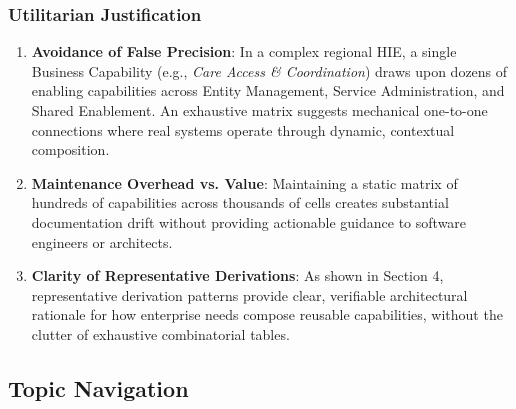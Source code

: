 \label{rad:tier-model:266}
\subsubsection*{Utilitarian Justification}
\label{rad:tier-model:267}

\begin{enumerate}

\item
\textbf{Avoidance of False Precision}: In a complex regional HIE, a single Business Capability (e.g., \emph{Care Access \& Coordination}) draws upon dozens of enabling capabilities across Entity Management, Service Administration, and Shared Enablement. An exhaustive matrix suggests mechanical one-to-one connections where real systems operate through dynamic, contextual composition.



\item
\textbf{Maintenance Overhead vs. Value}: Maintaining a static matrix of hundreds of capabilities across thousands of cells creates substantial documentation drift without providing actionable guidance to software engineers or architects.



\item
\textbf{Clarity of Representative Derivations}: As shown in Section 4, representative derivation patterns provide clear, verifiable architectural rationale for how enterprise needs compose reusable capabilities, without the clutter of exhaustive combinatorial tables.



\end{enumerate}
\label{rad:tier-model:271}

\par\smallskip
{}\label{rad:tier-model:273}
\subsection*{Topic Navigation}
\label{rad:tier-model:275}

